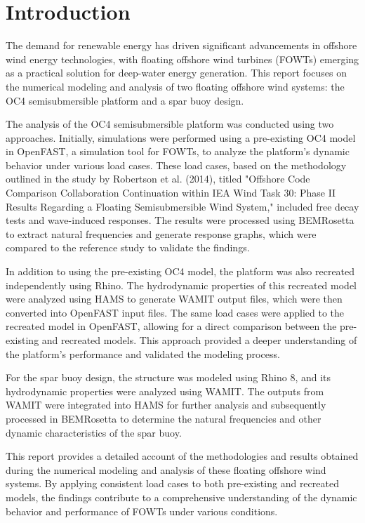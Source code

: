 \documentclass[a4paper]{article}
\begin{document}
\section{Introduction}

\hspace*{0.5cm}The demand for renewable energy has driven significant advancements in offshore wind energy technologies, with floating offshore wind turbines (FOWTs) emerging as a practical solution for deep-water energy generation. This report focuses on the numerical modeling and analysis of two floating offshore wind systems: the OC4 semisubmersible platform and a spar buoy design.

The analysis of the OC4 semisubmersible platform was conducted using two approaches. Initially, simulations were performed using a pre-existing OC4 model in OpenFAST, a simulation tool for FOWTs, to analyze the platform's dynamic behavior under various load cases. These load cases, based on the methodology outlined in the study by Robertson et al. (2014), titled "Offshore Code Comparison Collaboration Continuation within IEA Wind Task 30: Phase II Results Regarding a Floating Semisubmersible Wind System," included free decay tests and wave-induced responses. The results were processed using BEMRosetta to extract natural frequencies and generate response graphs, which were compared to the reference study to validate the findings.

In addition to using the pre-existing OC4 model, the platform was also recreated independently using Rhino. The hydrodynamic properties of this recreated model were analyzed using HAMS to generate WAMIT output files, which were then converted into OpenFAST input files. The same load cases were applied to the recreated model in OpenFAST, allowing for a direct comparison between the pre-existing and recreated models. This approach provided a deeper understanding of the platform's performance and validated the modeling process.

For the spar buoy design, the structure was modeled using Rhino 8, and its hydrodynamic properties were analyzed using WAMIT. The outputs from WAMIT were integrated into HAMS for further analysis and subsequently processed in BEMRosetta to determine the natural frequencies and other dynamic characteristics of the spar buoy.

This report provides a detailed account of the methodologies and results obtained during the numerical modeling and analysis of these floating offshore wind systems. By applying consistent load cases to both pre-existing and recreated models, the findings contribute to a comprehensive understanding of the dynamic behavior and performance of FOWTs under various conditions.
\end{document}
